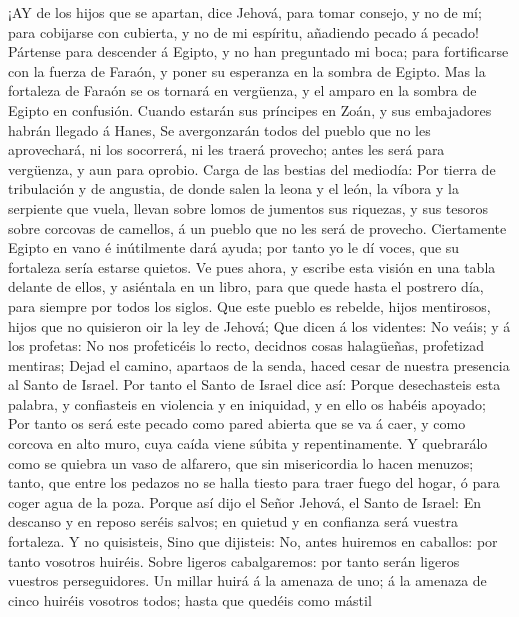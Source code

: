  ¡AY de los hijos que se apartan, dice Jehová, para tomar
consejo, y no de mí; para cobijarse con cubierta, y no de mi espíritu,
añadiendo pecado á pecado!  Pártense para descender á
Egipto, y no han preguntado mi boca; para fortificarse con la fuerza de
Faraón, y poner su esperanza en la sombra de Egipto.  Mas la
fortaleza de Faraón se os tornará en vergüenza, y el amparo en la sombra
de Egipto en confusión.  Cuando estarán sus príncipes en
Zoán, y sus embajadores habrán llegado á Hanes,  Se
avergonzarán todos del pueblo que no les aprovechará, ni los socorrerá,
ni les traerá provecho; antes les será para vergüenza, y aun para
oprobio.  Carga de las bestias del mediodía: Por tierra de
tribulación y de angustia, de donde salen la leona y el león, la víbora
y la serpiente que vuela, llevan sobre lomos de jumentos sus riquezas, y
sus tesoros sobre corcovas de camellos, á un pueblo que no les será de
provecho.  Ciertamente Egipto en vano é inútilmente dará
ayuda; por tanto yo le dí voces, que su fortaleza sería estarse quietos.
 Ve pues ahora, y escribe esta visión en una tabla delante
de ellos, y asiéntala en un libro, para que quede hasta el postrero día,
para siempre por todos los siglos.  Que este pueblo es
rebelde, hijos mentirosos, hijos que no quisieron oir la ley de Jehová;
 Que dicen á los videntes: No veáis; y á los profetas: No
nos profeticéis lo recto, decidnos cosas halagüeñas, profetizad
mentiras;  Dejad el camino, apartaos de la senda, haced
cesar de nuestra presencia al Santo de Israel.  Por tanto
el Santo de Israel dice así: Porque desechasteis esta palabra, y
confiasteis en violencia y en iniquidad, y en ello os habéis apoyado;
 Por tanto os será este pecado como pared abierta que se va
á caer, y como corcova en alto muro, cuya caída viene súbita y
repentinamente.  Y quebrarálo como se quiebra un vaso de
alfarero, que sin misericordia lo hacen menuzos; tanto, que entre los
pedazos no se halla tiesto para traer fuego del hogar, ó para coger agua
de la poza.  Porque así dijo el Señor Jehová, el Santo de
Israel: En descanso y en reposo seréis salvos; en quietud y en confianza
será vuestra fortaleza. Y no quisisteis,  Sino que
dijisteis: No, antes huiremos en caballos: por tanto vosotros huiréis.
Sobre ligeros cabalgaremos: por tanto serán ligeros vuestros
perseguidores.  Un millar huirá á la amenaza de uno; á la
amenaza de cinco huiréis vosotros todos; hasta que quedéis como mástil
